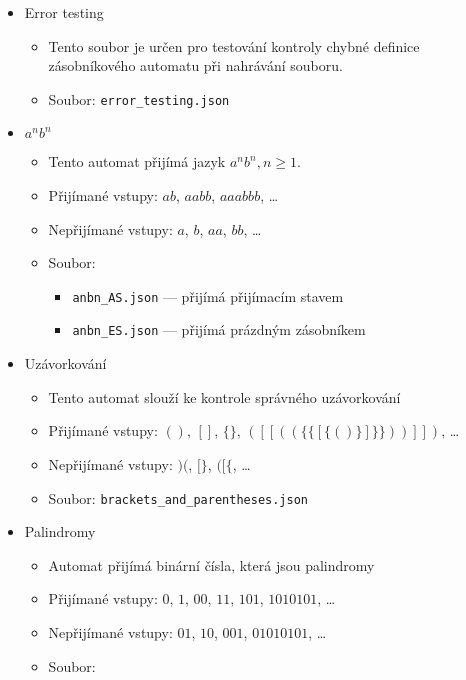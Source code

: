 \begin{itemize}
    \item Error testing
        \begin{itemize}
            \item Tento soubor je určen pro testování kontroly chybné definice zásobníkového automatu při nahrávání souboru.
            \item Soubor: \texttt{error\_testing.json}
        \end{itemize}
    \item $a^{n}b^{n}$
        \begin{itemize}
            \item Tento automat přijímá jazyk $a^nb^n, n \ge 1$.
            \item Přijímané vstupy: $ab$, $aabb$, $aaabbb$, \ldots
            \item Nepřijímané vstupy: $a$, $b$, $aa$, $bb$, \ldots
            \item Soubor:
                \begin{itemize}
                    \item \texttt{anbn\_AS.json} --- přijímá přijímacím stavem
                    \item \texttt{anbn\_ES.json} --- přijímá prázdným zásobníkem
                \end{itemize}
        \end{itemize}
    \item Uzávorkování
        \begin{itemize}
            \item Tento automat slouží ke kontrole správného uzávorkování
            \item Přijímané vstupy: $()$, $[]$, $\{\}$, $([[((\{\{[\{()\}]\}\}))]])$, \ldots
            \item Nepřijímané vstupy: $)($, $[\}$, $([\{$, \ldots
            \item Soubor: \texttt{brackets\_and\_parentheses.json}
        \end{itemize}
    \item Palindromy
        \begin{itemize}
            \item Automat přijímá binární čísla, která jsou palindromy
            \item Přijímané vstupy: $0$, $1$, $00$, $11$, $101$, $1010101$, \ldots
            \item Nepřijímané vstupy: $01$, $10$, $001$, $01010101$, \ldots
            \item Soubor: 

\end{itemize}
\end{itemize}

